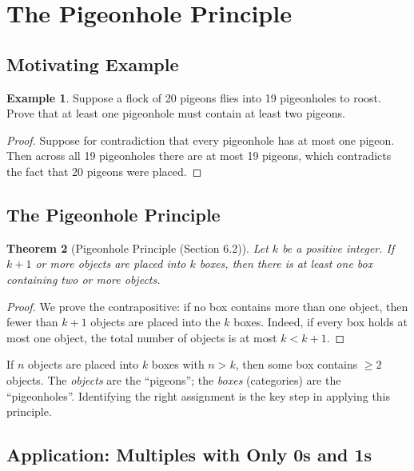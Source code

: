 \documentclass[11pt, a4paper, notitlepage]{report}
\newtheorem{theorem}{Theorem}[section]
\theoremstyle{definition}
\newtheorem{example}[theorem]{Example}
\theoremstyle{remark}
\begin{document}
\newpage
\section{The Pigeonhole Principle}
\label{sec:pigeonhole}

\subsection{Motivating Example}

\begin{example}
Suppose a flock of 20 pigeons flies into 19 pigeonholes to roost. Prove that at least one
pigeonhole must contain at least two pigeons.
\end{example}

\begin{proof}
Suppose for contradiction that every pigeonhole has at most one pigeon. Then across all 19
pigeonholes there are at most 19 pigeons, which contradicts the fact that 20 pigeons were placed.
\end{proof}

\subsection{The Pigeonhole Principle}

\begin{theorem}[Pigeonhole Principle (Section 6.2)]
\label{thm:pigeonhole}
Let $k$ be a positive integer. If $k+1$ or more objects are placed into $k$ boxes, then
there is at least one box containing two or more objects.
\end{theorem}

\begin{proof}
We prove the contrapositive: if no box contains more than one object, then fewer than $k+1$
objects are placed into the $k$ boxes. Indeed, if every box holds at most one object, the total
number of objects is at most $k < k+1$.
\end{proof}

\begin{keyresult}[title={Key Result: Pigeonhole Principle}]
If $n$ objects are placed into $k$ boxes with $n > k$, then some box contains $\geq 2$ objects.
The \emph{objects} are the ``pigeons''; the \emph{boxes} (categories) are the ``pigeonholes''.
Identifying the right assignment is the key step in applying this principle.
\end{keyresult}

\subsection{Application: Multiples with Only 0s and 1s}
\end{document}
